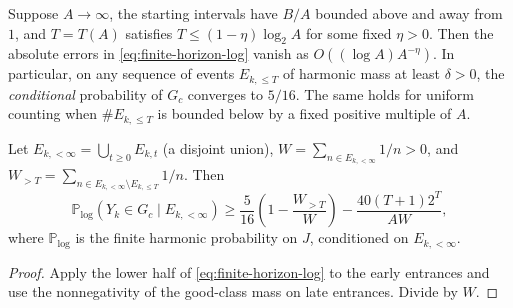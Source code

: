 \begin{corollary}
\label{cor:finite-horizon-transport}
Suppose $A\to\infty$, the starting intervals have $B/A$
bounded above and away from $1$, and $T=T(A)$ satisfies
$T\le(1-\eta)\log_2 A$ for some fixed $\eta>0$. Then the
absolute errors in \eqref{eq:finite-horizon-log} vanish as
$O((\log A)A^{-\eta})$. In particular, on any sequence
of events $E_{k,\le T}$ of harmonic mass at least
$\delta>0$, the \emph{conditional} probability of $G_c$
converges to $5/16$. The same holds for uniform counting
when $\#E_{k,\le T}$ is bounded below by a fixed positive
multiple of $A$.
\end{corollary}


\begin{corollary}
\label{cor:finite-horizon-early-late}
Let $E_{k,<\infty}=\bigcup_{t\ge0}E_{k,t}$ (a disjoint union),
$W=\sum_{n\in E_{k,<\infty}}1/n>0$, and
$W_{>T}=\sum_{n\in E_{k,<\infty}\setminus E_{k,\le T}}1/n$.
Then
\[
 \mathbb P_{\log}(Y_k\in G_c\mid E_{k,<\infty})
 \ge \frac5{16}\left(1-\frac{W_{>T}}W\right)
     -\frac{40(T+1)2^T}{AW},
\]
where $\mathbb P_{\log}$ is the finite harmonic probability on $J$,
conditioned on $E_{k,<\infty}$.
\end{corollary}
\begin{proof}
Apply the lower half of \eqref{eq:finite-horizon-log} to the early
entrances and use the nonnegativity of the good-class mass on late
entrances. Divide by $W$.
\end{proof}



